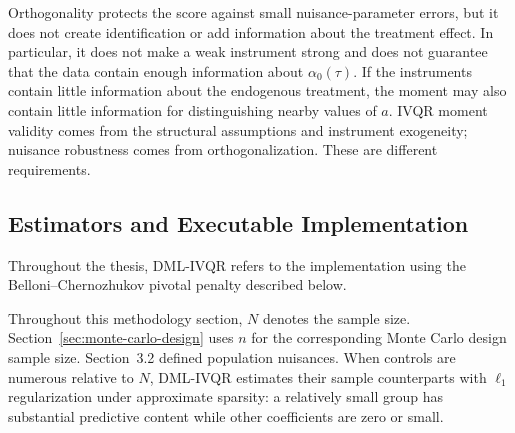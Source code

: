Orthogonality protects the score against small nuisance-parameter errors, but it does not create identification or add information about the treatment effect. In particular, it does not make a weak instrument strong and does not guarantee that the data contain enough information about $\alpha_0(\tau)$. If the instruments contain little information about the endogenous treatment, the moment may also contain little information for distinguishing nearby values of $a$. IVQR moment validity comes from the structural assumptions and instrument exogeneity; nuisance robustness comes from orthogonalization. These are different requirements.

\subsection{Estimators and Executable Implementation}

Throughout the thesis, DML-IVQR refers to the implementation using the Belloni--Chernozhukov pivotal penalty described below.

Throughout this methodology section, $N$ denotes the sample size. Section~\ref{sec:monte-carlo-design} uses $n$ for the corresponding Monte Carlo design sample size. Section~3.2 defined population nuisances. When controls are numerous relative to $N$, DML-IVQR estimates their sample counterparts with $\ell_1$ regularization under approximate sparsity: a relatively small group has substantial predictive content while other coefficients are zero or small.


